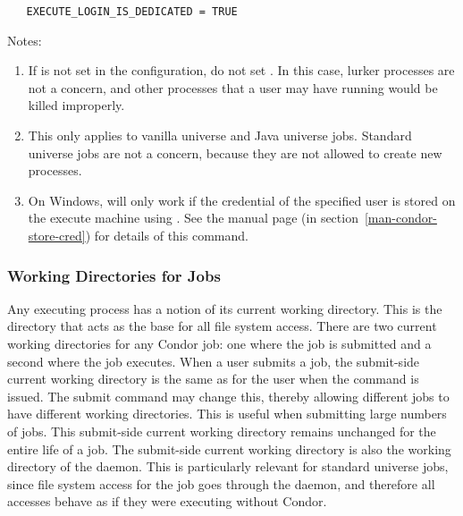 \begin{verbatim}
   EXECUTE_LOGIN_IS_DEDICATED = TRUE
\end{verbatim}

Notes:
\begin{enumerate}

\item{
If  is not set in the configuration, do not
set .
In this case, lurker processes are not a concern,
and other processes that a user may have running would be killed
improperly.
}

\item{
This only applies to vanilla universe and Java universe jobs.
Standard universe jobs are not a concern,
because they are not allowed to create new processes.
}

\item{
On Windows,  will only work if the credential
of the specified user is stored on the execute machine
using .
See the 
manual page (in section~\ref{man-condor-store-cred})
for details of this command.
}
\end{enumerate}


\subsubsection{\label{sec:DirOfJob}Working Directories for Jobs}

Any executing process has a notion of its current working directory.
This is the directory that acts as the base for all file system
access. 
There are two current working directories for any Condor job:
one where the job is submitted and a
second where the job executes.
When a user submits a job,
the submit-side current working directory is
the same as for the user when the  command
is issued.
The  submit command may change this,
thereby allowing different jobs to have different working
directories.
This is useful when submitting large numbers of jobs.
This submit-side current working directory remains unchanged for the
entire life of a job. 
The submit-side current working directory is also 
the working directory of the  daemon.
This is particularly relevant for standard universe jobs,
since file system
access for the job goes through the  daemon, and
therefore all accesses behave as if they were executing without
Condor.

